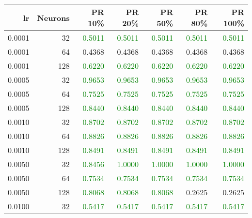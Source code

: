 \begin{tabular}{rrrrrrr}
\toprule
lr & Neurons & PR 10\% & PR 20\% & PR 50\% & PR 80\% & PR 100\% \\
\midrule
0.0001 & 32 & \textcolor{green} {0.5011} & \textcolor{green} {0.5011} & \textcolor{green} {0.5011} & \textcolor{green} {0.5011} & \textcolor{green} {0.5011} \\
0.0001 & 64 & \textcolor{blu} {0.4368} & \textcolor{blu} {0.4368} & \textcolor{blu} {0.4368} & \textcolor{blu} {0.4368} & \textcolor{blu} {0.4368} \\
0.0001 & 128 & \textcolor{green} {0.6220} & \textcolor{green} {0.6220} & \textcolor{green} {0.6220} & \textcolor{green} {0.6220} & \textcolor{green} {0.6220} \\
0.0005 & 32 & \textcolor{green} {0.9653} & \textcolor{green} {0.9653} & \textcolor{green} {0.9653} & \textcolor{green} {0.9653} & \textcolor{green} {0.9653} \\
0.0005 & 64 & \textcolor{green} {0.7525} & \textcolor{green} {0.7525} & \textcolor{green} {0.7525} & \textcolor{green} {0.7525} & \textcolor{green} {0.7525} \\
0.0005 & 128 & \textcolor{green} {0.8440} & \textcolor{green} {0.8440} & \textcolor{green} {0.8440} & \textcolor{green} {0.8440} & \textcolor{green} {0.8440} \\
0.0010 & 32 & \textcolor{green} {0.8702} & \textcolor{green} {0.8702} & \textcolor{green} {0.8702} & \textcolor{green} {0.8702} & \textcolor{green} {0.8702} \\
0.0010 & 64 & \textcolor{green} {0.8826} & \textcolor{green} {0.8826} & \textcolor{green} {0.8826} & \textcolor{green} {0.8826} & \textcolor{green} {0.8826} \\
0.0010 & 128 & \textcolor{green} {0.8491} & \textcolor{green} {0.8491} & \textcolor{green} {0.8491} & \textcolor{green} {0.8491} & \textcolor{green} {0.8491} \\
0.0050 & 32 & \textcolor{green} {0.8456} & \textcolor{green} {1.0000} & \textcolor{green} {1.0000} & \textcolor{green} {1.0000} & \textcolor{green} {1.0000} \\
0.0050 & 64 & \textcolor{green} {0.7534} & \textcolor{green} {0.7534} & \textcolor{green} {0.7534} & \textcolor{green} {0.7534} & \textcolor{green} {0.7534} \\
0.0050 & 128 & \textcolor{green} {0.8068} & \textcolor{green} {0.8068} & \textcolor{green} {0.8068} & \textcolor{blu} {0.2625} & \textcolor{blu} {0.2625} \\
0.0100 & 32 & \textcolor{green} {0.5417} & \textcolor{green} {0.5417} & \textcolor{green} {0.5417} & \textcolor{green} {0.5417} & \textcolor{green} {0.5417} \\

\end{tabular}
